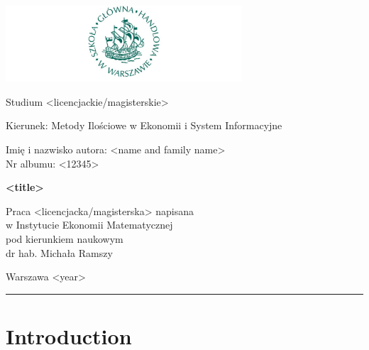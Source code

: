 \documentclass[english, twoside, 12pt, a4paper]{article}
\theoremstyle{definition}
\theoremstyle{plain}
\theoremstyle{remark}
\begin{document}
\begin{titlepage}
\centering

\includegraphics[width=0.66\textwidth]{logo.JPG}

\vspace*{0.5cm}
Studium <licencjackie/magisterskie>\\
\begin{flushleft}
Kierunek: Metody Ilościowe w Ekonomii i System Informacyjne\\
\end{flushleft}

\vspace*{.5cm}
\rule{0cm}{1cm}\hfill
\begin{minipage}{9cm}
Imię i nazwisko autora: <name and family name>\\
Nr albumu: <12345>
\end{minipage}

\vspace*{1cm}
\begin{minipage}{12cm}
\centering
\Large
\textbf{<title>}
\end{minipage}

\vspace*{2cm}
\rule{0cm}{1cm}\hfill
\begin{minipage}{9cm}
Praca <licencjacka/magisterska> napisana\\
w Instytucie Ekonomii Matematycznej\\
pod kierunkiem naukowym\\
dr hab. Michała Ramszy
\end{minipage}

\vfill
Warszawa <year>
\end{titlepage}

\rule{1ex}{0ex}\clearpage

\cleardoublepage
\tableofcontents

\cleardoublepage
\section{Introduction}
\end{document}
